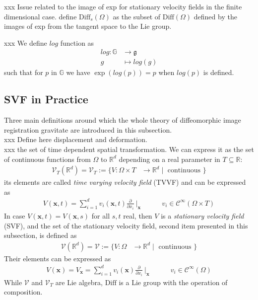 xxx Issue related to the image of exp for stationary velocity fields in the finite dimensional case. define $\text{Diff}_{s}(\Omega)$ as the subset of $\text{Diff}(\Omega)$ defined by the images of exp from the tangent space to the Lie group.


xxx We define $log$ function as
\begin{align*}
log : \mathbb{G} & \longrightarrow  \mathfrak{g}    \\
g &\longmapsto log(g)
\end{align*}
such that for $p$ in $\mathbb{G}$ we have $\exp(log(p)) = p$ when $log(p)$ is defined.



\subsection{SVF in Practice}

Three main definitions around which the whole theory of diffeomorphic image registration gravitate are introduced in this subsection. \\
xxx Define here displacement and deformation.\\
xxx the set of time dependent spatial transformation. We can express it as the set of continuous functions from $\Omega$ to $\mathbb{R}^{d}$ depending on a real parameter in $T\subseteq \mathbb{R}$:
\begin{align*}
\mathcal{V}_{T}(\mathbb{R}^{d}) = \mathcal{V}_{T} := \lbrace V : \Omega \times T &\longrightarrow \mathbb{R}^d \mid \text{ continuous } \rbrace 
\end{align*}
its elements are called \emph{time varying velocity field} (TVVF) and can be expressed as
\begin{align*}
V(\mathbf{x},t) = \sum_{i=1}^{d} v_{i}(\mathbf{x},t) \frac{\partial}{\partial x_{i}}~\Bigr|_{\mathbf{x}} 
\qquad 
\quad 
v_{i} \in \mathcal{C}^{\infty} (\Omega \times T)
\end{align*}
In case $V(\mathbf{x},t) = V(\mathbf{x},s)$ for all $s,t$ real, then $V$ is a \emph{stationary velocity field} (SVF), and the set of the stationary velocity field, second item presented in this subsection, is defined as
\begin{align*}
\mathcal{V}(\mathbb{R}^{d}) = \mathcal{V} := \lbrace V : \Omega &\longrightarrow \mathbb{R}^d \mid \text{ continuous } \rbrace 
\end{align*}
Their elements can be expressed as 
\begin{align*}
V(\mathbf{x}) = V_{\mathbf{x}} = \sum_{i=1}^{d} v_{i}(\mathbf{x}) \frac{\partial}{\partial x_{i}}~\Bigr|_{\mathbf{x}} \qquad \quad v_{i} \in \mathcal{C}^{\infty} (\Omega)
\end{align*}
While $\mathcal{V}$ and $\mathcal{V}_{T}$ are Lie algebra, $\text{Diff}$ is a Lie group with the operation of composition.\\

